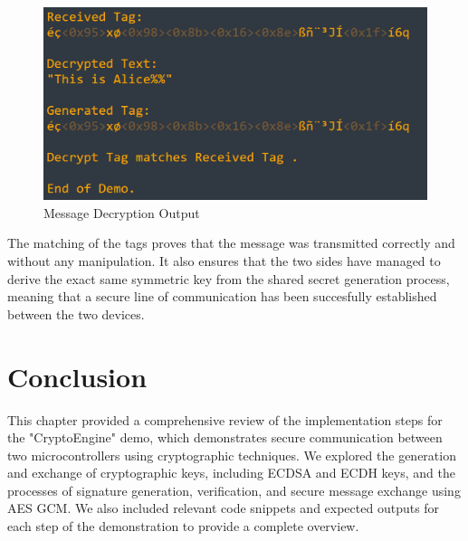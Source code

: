     \begin{figure}[H]
    \centering
    \includegraphics[width=14cm]{img/end of demo.png}
        \caption{Message Decryption Output}
    \label{fig:tag}
    \end{figure}
The matching of the tags proves that the message was transmitted correctly and without any manipulation. It also ensures that the two sides have managed to derive the exact same symmetric key from the shared secret generation process, meaning that a secure line of communication has been succesfully established between the two devices.
\section*{Conclusion}
This chapter provided a comprehensive review of the implementation steps for the "CryptoEngine" demo, which demonstrates secure communication between two microcontrollers using cryptographic techniques. We explored the generation and exchange of cryptographic keys, including ECDSA and ECDH keys, and the processes of signature generation, verification, and secure message exchange using AES GCM. We also included relevant code snippets and expected outputs for each step of the demonstration to provide a complete overview.